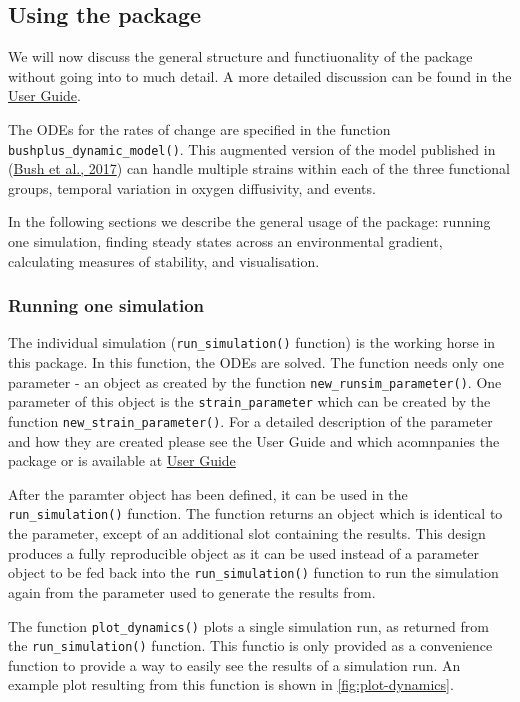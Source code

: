 \documentclass[
]{article}
\begin{document}
\hypertarget{runsim}{%
\subsection{Using the package}\label{runsim}}

We will now discuss the general structure and functiuonality of the package without going into to much detail. A more detailed discussion can be found in the \href{LINK_NEEDED}{User Guide}.

The ODEs for the rates of change are specified in the function \texttt{bushplus\_dynamic\_model()}. This augmented version of the model published in (\protect\hyperlink{ref-Bush2017}{Bush et al., 2017}) can handle multiple strains within each of the three functional groups, temporal variation in oxygen diffusivity, and events.

In the following sections we describe the general usage of the package: running one simulation, finding steady states across an environmental gradient, calculating measures of stability, and visualisation.

\hypertarget{running-one-simulation}{%
\subsubsection{Running one simulation}\label{running-one-simulation}}

The individual simulation (\texttt{run\_simulation()} function) is the working horse in this package. In this function, the ODEs are solved. The function needs only one parameter - an object as created by the function \texttt{new\_runsim\_parameter()}. One parameter of this object is the \texttt{strain\_parameter} which can be created by the function \texttt{new\_strain\_parameter()}. For a detailed description of the parameter and how they are created please see the User Guide and which acomnpanies the package or is available at \href{@LINK_NEEDED}{User Guide}

After the paramter object has been defined, it can be used in the \texttt{run\_simulation()} function. The function returns an object which is identical to the parameter, except of an additional slot containing the results. This design produces a fully reproducible object as it can be used instead of a parameter object to be fed back into the \texttt{run\_simulation()} function to run the simulation again from the parameter used to generate the results from.

The function \texttt{plot\_dynamics()} plots a single simulation run, as returned from the \texttt{run\_simulation()} function. This functio is only provided as a convenience function to provide a way to easily see the results of a simulation run. An example plot resulting from this function is shown in \ref{fig:plot-dynamics}.
\end{document}
